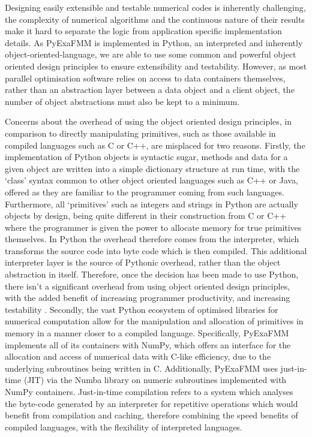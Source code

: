 Designing easily extensible and testable numerical codes is inherently challenging,
the complexity of numerical algorithms and the continuous nature of their results
make it hard to separate the logic from application specific implementation details.
As \gls{PyExaFMM} is implemented in Python, an \gls{interpreted} and inherently
\gls{object-oriented-language}, we are able to
use some common and powerful object oriented design principles to ensure extensibility
and testability. However, as most parallel optimisation software relies on access to data
containers themselves, rather than an abstraction layer between a data object
and a client object, the number of object abstractions must also be kept to a
minimum.

Concerns about the overhead of using the object oriented design principles, in comparison to directly manipulating
primitives, such as those available in compiled languages such as C
or C++, are misplaced for two reasons. Firstly, the implementation of Python objects
is syntactic sugar, methods and data for a given object are written into
a simple dictionary structure at run time, with the `class' syntax common to other
object oriented languages such as C++ or Java, offered as they are familiar to
the programmer coming from such languages. Furthermore, all `primitives' such as
integers and strings in Python are actually objects by design, being quite different
in their construction from C or C++ where the programmer is given the power to
allocate memory for true primitives themselves. In Python the overhead therefore
comes from the interpreter, which transforms the source code into byte code which
is then compiled. This additional interpreter layer is the source of Pythonic overhead,
rather than the object abstraction in itself. Therefore, once the decision has
been made to use Python, there isn't a significant overhead from using object
oriented design principles, with the added benefit of increasing programmer
productivity, and increasing testability \cite{Ramalho:2015:Oreilly}. Secondly,
the vast Python ecosystem of optimised libraries for numerical computation allow
for the manipulation and allocation of primitives in memory in a manner closer to a compiled language.
Specifically, \gls{PyExaFMM} implements all of its containers with NumPy, which
offers an interface for the allocation and access of numerical data with C-like
efficiency, due to the underlying subroutines being written in C. Additionally,
\gls{PyExaFMM} uses just-in-time (\gls{JIT}) via the Numba library on
numeric subroutines implemented with NumPy containers. Just-in-time compilation
refers to a system which analyses the byte-code generated by an interpreter
for repetitive operations which would benefit from compilation and caching, therefore
combining the speed benefits of compiled languages, with the flexibility of interpreted
languages.

